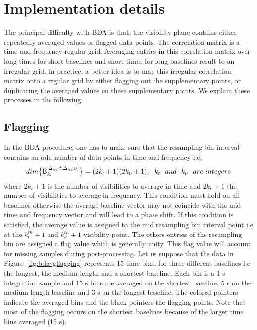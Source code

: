 \documentclass[useAMS,usenatbib]{mn2e}
\begin{document}
\section{Implementation details}
\label{BDA:impl}
The principal difficulty with BDA is that, the visibility plane contains either repeatedly averaged values or 
flagged data points. The correlation matrix is a  time and frequency regular grid.
Averaging entries in this correlation matrix
over long times for  short baselines and short times for  long baselines result to an irregular grid.  
In practice, a better idea is to map this irregular
correlation matrix onto a regular grid by either
flagging out the supplementary points, or duplicating the averaged values on these supplementary points.
We explain these processes in the following. 
\subsection{Flagging}
In the BDA procedure, one has to make sure  that the resampling bin interval contains an 
odd number of data points in time and frequency i.e,
\begin{equation}
dim \big\{\mathsf{B}^{[\Delta_{\alpha \beta} t, \Delta_{\alpha \beta} \nu]}_{kl}\big\}=(2k_t+1)(2k_{\nu}+1), ~~ k_t ~~ and ~~ k_{\nu} ~~ are~ integers
\end{equation}
where $2k_t+1$ is the 
number of visibilities to average in time and $2k_{\nu}+1$ the number of visibilities to average in frequency.  
This condition must hold on all baselines otherwise the average
baseline vector may not coincide with the mid time and frequency vector and will lead to a phase shift. 
If this condition is satisfied,
the average value is assigned to the mid resampling bin interval point i.e at the $k_t^{th}+1$ and $k_{\nu}^{th}+1$ visibility point. The 
others entries of the resampling bin are assigned a flag value which is generally unity. 
This flag  value will account for missing samples during  post-processing. 
Let us suppose that the data in Figure~\ref{fig:bdavgflagging} represents 15 time-bins,  for three different baselines i.e
the longest, the medium length and a shortest baseline.
Each bin is a 1 s integration sample and  15 s bins are averaged on the shortest baseline, 
5 s    on the medium length baseline and 
3 s on the longest baseline. The colored pointers indicate the averaged bins and the black pointers the flagging points. 
Note that most of the flagging occurs on the shortest baselines because of the larger time bins averaged (15 s).
\end{document}
